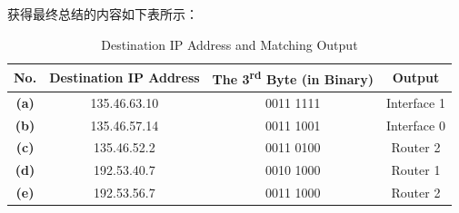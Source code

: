 获得最终总结的内容如下表所示：

\begin{table}[H]
  \centering
  \renewcommand{\arraystretch}{1.3}
  \setlength{\tabcolsep}{12pt}
  \begin{tabular}{|c|c|c|c|}
      \hline
      \textbf{No.} & \textbf{Destination IP Address} & \textbf{The 3\textsuperscript{rd} Byte (in Binary)} & \textbf{Output} \\ \hline
      \textbf{(a)} & 135.46.63.10 & 0011 1111 & Interface 1 \\ \hline
      \textbf{(b)} & 135.46.57.14 & 0011 1001 & Interface 0 \\ \hline
      \textbf{(c)} & 135.46.52.2  & 0011 0100 & Router 2 \\ \hline
      \textbf{(d)} & 192.53.40.7  & 0010 1000 & Router 1 \\ \hline
      \textbf{(e)} & 192.53.56.7  & 0011 1000 & Router 2 \\ \hline
  \end{tabular}
  \caption{Destination IP Address and Matching Output}
\end{table}

